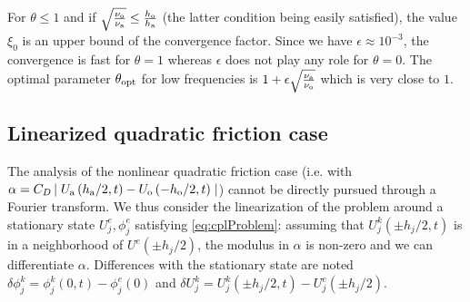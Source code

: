For $\theta \leq 1$ and if 
$\sqrt{\frac{\nu_{\rm o}}{\nu_{\rm a}}} \leq \frac{h_{\rm o}}{h_{\rm a}}$
(the latter condition being easily satisfied), 
the value $\xi_0$ is an upper bound 
of the convergence factor.
Since we have $\epsilon \approx 10^{-3}$, 
the convergence is fast for $\theta = 1$ whereas $\epsilon$
does not play any role for $\theta = 0$.
%
The optimal parameter $\theta_{\rm opt}$ for low frequencies is $1 +  \epsilon\sqrt{\frac{\nu_{\rm a}}{\nu_{\rm o}}}$ which is very close to $1$.
\subsection{Linearized quadratic friction case}
The analysis of the nonlinear quadratic friction case (i.e. with $\alpha = C_D\left|\right.U_{\rm a}\left(h_{\rm a} / 2, t\right) - U_{\rm o}\left(- h_{\rm o}/2, t\right)\left.\right|$)
cannot be directly pursued through a Fourier transform.
We thus consider the linearization of the problem 
around a stationary state $U^e_j, \phi^e_j$ satisfying \eqref{eq:cplProblem}:
assuming that $U^k_j (\pm h_j/2, t)$ is in a neighborhood of $U^e(\pm h_j/2)$, the modulus in $\alpha$
is non-zero and
we can differentiate $\alpha$.
Differences with the stationary state are noted $\delta \phi_j^k = \phi^k_j(0,t) - \phi_j^e(0)$ and $\delta U_j^k = U_j^k(\pm h_j/2, t) - U^e_j(\pm h_j/2)$.
